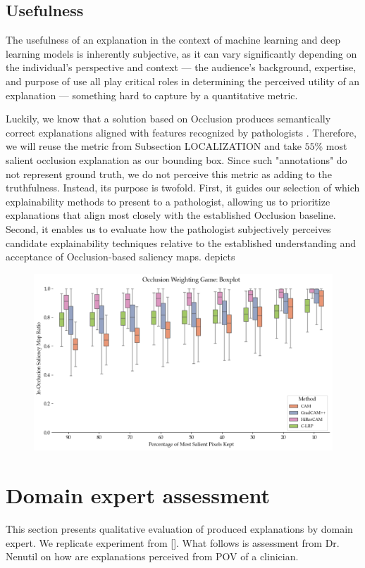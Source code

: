 \subsection*{Usefulness}

The usefulness of an explanation in the context of machine learning and deep learning models is inherently subjective, as it can vary significantly depending on the individual's perspective and context --- the audience's background, expertise, and purpose of use all play critical roles in determining the perceived utility of an explanation \cite{xai-doshi} --- something hard to capture by a quantitative metric.

Luckily, we know that a solution based on Occlusion produces semantically correct explanations aligned with features recognized by pathologists \cite{gallo}.
Therefore, we will reuse the metric from Subsection LOCALIZATION and take $55$\% most salient occlusion explanation as our bounding box.
Since such "annotations" do not represent ground truth, we do not perceive this metric as adding to the truthfulness.
Instead, its purpose is twofold.
First, it guides our selection of which explainability methods to present to a pathologist, allowing us to prioritize explanations that align most closely with the established Occlusion baseline.
Second, it enables us to evaluate how the pathologist subjectively perceives candidate explainability techniques relative to the established understanding and acceptance of Occlusion-based saliency maps.
 depicts 

\begin{figure}
    \begin{center}
    \begin{minipage}{1\textwidth}
      \includegraphics[width=\textwidth]{img/occlusion-weighting-game-boxplot.png}
    \end{minipage}
    \caption{}
    \label{fig:occ-weighting-game-boxplot}
    \end{center}
\end{figure}

\section{Domain expert assessment}

This section presents qualitative evaluation of produced explanations by domain expert. We replicate experiment from []. What follows is assessment from Dr. Nenutil on how are explanations perceived from POV of a clinician.
